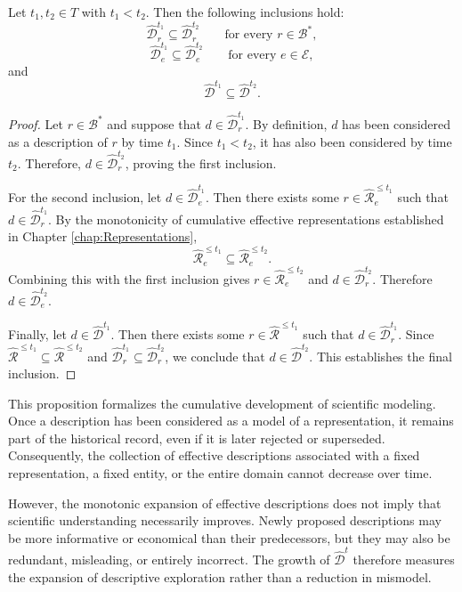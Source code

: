 \begin{proposition}
\label{prop:effective_descriptions_monotonic}
Let $t_1,t_2\in T$ with $t_1<t_2$. Then the following inclusions hold:
\[
\hat{\mathcal{D}}_r^{t_1} \subseteq \hat{\mathcal{D}}_r^{t_2}
\qquad \text{for every }r\in\mathcal{B}^\ast,
\]
\[
\hat{\mathcal{D}}_e^{t_1} \subseteq \hat{\mathcal{D}}_e^{t_2}
\qquad \text{for every }e\in\mathcal{E},
\]
and
\[
\hat{\mathcal{D}}^{t_1} \subseteq \hat{\mathcal{D}}^{t_2}.
\]
\end{proposition}
\begin{proof}
Let $r\in\mathcal{B}^\ast$ and suppose that $d\in\hat{\mathcal{D}}_r^{t_1}$. By definition, $d$ has been considered as a description of $r$ by time $t_1$. Since $t_1<t_2$, it has also been considered by
time $t_2$. Therefore, $d\in\hat{\mathcal{D}}_r^{t_2}$, proving the first inclusion.

For the second inclusion, let $d\in\hat{\mathcal{D}}_e^{t_1}$. Then there exists some $r\in\hat{\mathcal{R}}_e^{\leq t_1}$ such that $d\in\hat{\mathcal{D}}_r^{t_1}$. By the monotonicity of cumulative effective representations established in Chapter \ref{chap:Representations},
\[
\hat{\mathcal{R}}_e^{\leq t_1} \subseteq \hat{\mathcal{R}}_e^{\leq t_2}.
\]
Combining this with the first inclusion gives $r\in\hat{\mathcal{R}}_e^{\leq t_2}$ and $d\in\hat{\mathcal{D}}_r^{t_2}$. Therefore $d\in\hat{\mathcal{D}}_e^{t_2}$.

Finally, let $d\in\hat{\mathcal{D}}^{t_1}$. Then there exists some $r\in\hat{\mathcal{R}}^{\leq t_1}$ such that $d\in\hat{\mathcal{D}}_r^{t_1}$. Since $\hat{\mathcal{R}}^{\leq t_1} \subseteq \hat{\mathcal{R}}^{\leq t_2}$ and $\hat{\mathcal{D}}_r^{t_1} \subseteq\hat{\mathcal{D}}_r^{t_2}$, we conclude that $d\in\hat{\mathcal{D}}^{t_2}$. This establishes the final inclusion.
\end{proof}

This proposition formalizes the cumulative development of scientific modeling. Once a description has been considered as a model of a representation, it remains part of the historical record, even if it is later rejected or superseded. Consequently, the collection of effective descriptions associated with a fixed representation, a fixed entity, or the entire domain cannot decrease over time.

However, the monotonic expansion of effective descriptions does not imply that scientific understanding necessarily improves. Newly proposed descriptions may be more informative or economical than their predecessors, but they may also be redundant, misleading, or entirely incorrect. The growth of $\hat{\mathcal{D}}^t$ therefore measures the expansion of descriptive exploration rather than a reduction in mismodel.

